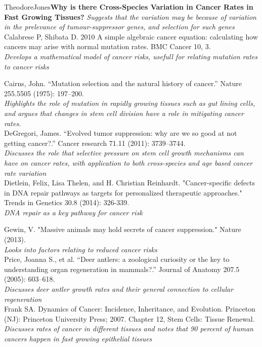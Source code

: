 \documentclass[12pt,letterpaper]{article}
\begin{document}
\begin{mla}{Theodore}{Jones}{}{}{}{\textbf{Why is there Cross-Species Variation in Cancer Rates in Fast Growing Tissues?}}
\emph{Suggests that the variation may be because of variation in the prelevance of tumour-suppressor genes, and selection for such genes}\\

Calabrese P, Shibata D. 2010 A simple algebraic cancer equation: calculating how cancers may arise with normal mutation rates. BMC Cancer 10, 3. \\

\emph{Develops a mathematical model of cancer risks, usefull for relating mutation rates to cancer risks}

Cairns, John. “Mutation selection and the natural history of cancer.” Nature 255.5505 (1975): 197–200.\\

\emph{Highlights the role of mutation in rapidly growing tissues such as gut lining cells, and argues that changes in stem cell division have a role in mitigating cancer rates.}\\

DeGregori, James. “Evolved tumor suppression: why are we so good at not getting cancer?.” Cancer research 71.11 (2011): 3739–3744.\\

\emph{Discusses the role that selective pressure on stem cell growth mechanisms can have on cancer rates, with application to both cross-species and age based cancer rate variation}\\
 \newpage
Dietlein, Felix, Lisa Thelen, and H. Christian Reinhardt. "Cancer-specific defects in DNA repair pathways as targets for personalized therapeutic approaches." Trends in Genetics 30.8 (2014): 326-339. \\
\emph{DNA repair as a key pathway for cancer risk}

Gewin, V. "Massive animals may hold secrets of cancer suppression." Nature (2013). \\
\emph{Looks into factors relating to reduced cancer risks} \\


Price, Joanna S., et al. “Deer antlers: a zoological curiosity or the key to understanding organ regeneration in mammals?.” Journal of Anatomy 207.5 (2005): 603–618.\\

\emph{Discusses deer antler growth rates and their general connection to cellular regeneration}\\

Frank SA. Dynamics of Cancer: Incidence, Inheritance, and Evolution. Princeton (NJ): Princeton University Press; 2007. Chapter 12, Stem Cells: Tissue Renewal. \\
\emph{
Discusses rates of cancer in different tissues and notes that 90 percent of human cancers happen in fast growing epithelial tissues}\\


\end{mla}
\end{document}
